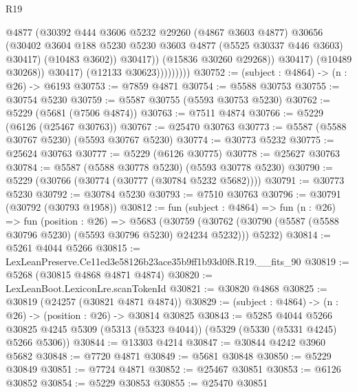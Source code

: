 \begin{lexlean}{R19}
\begin{coremodule}
                                @4877
                                (@30392
                                  @444
                                  @3606
                                  @5232
                                  @29260
                                  (@4867 @3603 @4877)
                                  @30656
                                  (@30402
                                    @3604
                                    @188
                                    @5230
                                    @5230
                                    @3603
                                    @4877
                                    (@5525 @30337 @446 @3603)
                                    @30417)
                                  (@10483 @3602))
                                @30417))
                            (@15836 @30260 @29268))
                          @30417)
                        (@10489 @30268))
                      @30417)
                    (@12133 @30623)))))))))
@30752 := (subject : @4864) -> (n : @26) -> @6193
@30753 := @7859 @4871
@30754 := @5588 @30753
@30755 := @30754 @5230
@30759 := @5587 @30755 (@5593 @30753 @5230)
@30762 := @5229 (@5681 (@7506 @4874))
@30763 := @7511 @4874
@30766 := @5229 (@6126 (@25467 @30763))
@30767 := @25470 @30763
@30773 := @5587 (@5588 @30767 @5230) (@5593 @30767 @5230)
@30774 := @30773 @5232
@30775 := @25624 @30763
@30777 := @5229 (@6126 @30775)
@30778 := @25627 @30763
@30784 := @5587 (@5588 @30778 @5230) (@5593 @30778 @5230)
@30790 := @5229 (@30766 (@30774 (@30777 (@30784 @5232 @5682))))
@30791 := @30773 @5230
@30792 := @30784 @5230
@30793 := @7510 @30763
@30796 := @30791 (@30792 (@30793 @1958))
@30812 := fun (subject : @4864) =>
  fun (n : @26) =>
  fun (position : @26) =>
  @5683
    (@30759 (@30762 (@30790 (@5587 (@5588 @30796 @5230) (@5593 @30796 @5230) @24234 @5232))) @5232)
@30814 := @5261 @4044 @5266
@30815 := LexLeanPreserve.Ce11ed3e58126b23ace35b9ff1b93d0f8.R19.__fits_90
@30819 := @5268 (@30815 @4868 @4871 @4874)
@30820 := LexLeanBoot.LexiconLre.scanTokenId
@30821 := @30820 @4868
@30825 := @30819 (@24257 (@30821 @4871 @4874))
@30829 := (subject : @4864) -> (n : @26) -> (position : @26) -> @30814 @30825
@30843 := @5285
    @4044
    @5266
    @30825
    @4245
    @5309
    (@5313 (@5323 @4044))
    (@5329 (@5330 (@5331 @4245) @5266 @5306))
@30844 := @13303 @4214
@30847 := @30844 @4242 @3960 @5682
@30848 := @7720 @4871
@30849 := @5681 @30848
@30850 := @5229 @30849
@30851 := @7724 @4871
@30852 := @25467 @30851
@30853 := @6126 @30852
@30854 := @5229 @30853
@30855 := @25470 @30851

\end{coremodule}
\end{lexlean}
